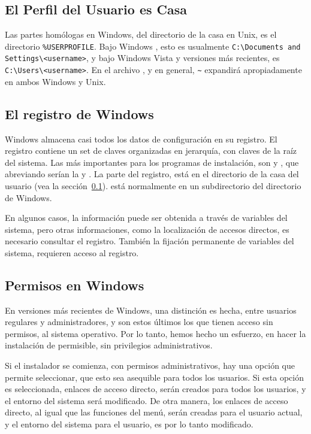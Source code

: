 \documentclass{article}
\begin{document}
\subsection{El Perfil del Usuario es Casa}
\label{sec:winhome}

Las partes homólogas en Windows, del directorio de la casa en Unix, es el
directorio \verb|%USERPROFILE|. Bajo Windows , esto es usualmente
\verb|C:\Documents and Settings\<username>|, y bajo Windows Vista y
versiones más recientes, es \verb|C:\Users\<username>|. En el archivo
, y \KPS{} en general, \verb|~| expandirá
apropiadamente en ambos Windows y Unix. 

\subsection{El registro de Windows}
\label{sec:registry}

Windows almacena casi todos los datos de configuración en su registro. El
registro contiene un set de claves organizadas en jerarquía, con claves de
la raíz del sistema. Las más importantes para los programas de
instalación, son  y , que
abreviando serían la  y . La parte  del
registro, está en el directorio de la casa del usuario (vea la
sección~\ref{sec:winhome}).  está normalmente en un
subdirectorio del directorio de Windows.

En algunos casos, la información puede ser obtenida a través de variables
del sistema, pero otras informaciones, como la localización de accesos
directos, es necesario consultar el registro. También la fijación
permanente de variables del sistema, requieren acceso al registro.

\subsection{Permisos en Windows}
\label{sec:winpermissions}

En versiones más recientes de Windows, una distinción es hecha, entre
usuarios regulares y administradores, y son estos últimos los que tienen
acceso sin permisos, al sistema operativo. Por lo tanto, hemos hecho un
esfuerzo, en hacer la instalación de \TL{} permisible, sin privilegios
administrativos. 

Si el instalador se comienza, con permisos administrativos, hay una
opción que permite seleccionar, que esto sea asequible para todos los
usuarios. Si esta opción es seleccionada, enlaces de acceso directo,
serán creados para todos los usuarios, y el entorno del sistema será
modificado. De otra manera, los enlaces de acceso directo, al igual
que las funciones del menú, serán creadas para el usuario actual, y el
entorno del sistema para el usuario, es por lo tanto modificado. 
\end{document}
